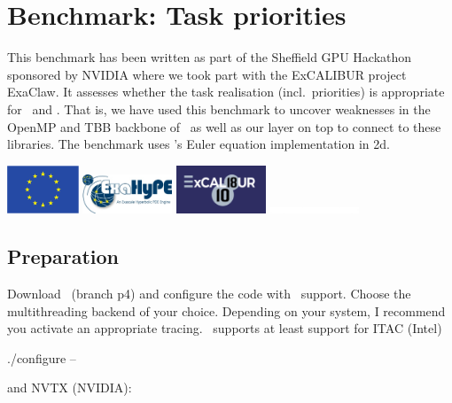 \chapter{Benchmark: Task priorities}
\label{chapter:benchmark:task-priorities}


This benchmark has been written as part of the Sheffield GPU Hackathon sponsored
by NVIDIA where we took part with the ExCALIBUR project ExaClaw.
It assesses whether the task realisation (incl.~priorities) is appropriate for
\Peano\ and \ExaHyPE.
That is, we have used this benchmark to uncover weaknesses in the OpenMP and TBB
backbone of \Peano\ as well as our layer on top to connect to these libraries.
The benchmark uses \ExaHyPE's Euler equation implementation in 2d.

\begin{center}
 \includegraphics[width=0.16\textwidth]{logos/EU.pdf}
 \includegraphics[width=0.2\textwidth]{logos/ExaHyPE-logo.png}
 \includegraphics[width=0.2\textwidth]{logos/excalibur.png}
 \includegraphics[width=0.2\textwidth]{logos/GPUHackathon-white-logo.png}
\end{center}


\section{Preparation}

Download \Peano\ (branch p4) and configure the code with \ExaHyPE\ support.
Choose the multithreading backend of your choice.
Depending on your system, I recommend you activate an appropriate tracing.
\Peano\ supports at least support for ITAC (Intel) 

\begin{code}
 ./configure --
\end{code}

\noindent
and NVTX (NVIDIA):

